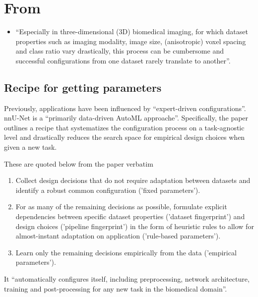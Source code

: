\documentclass[11pt]{article}
\begin{document}


\tableofcontents

\clearpage

\section{From~\cite{nnunet-git-paper}}

\begin{itemize}
    \item ``Especially in three-dimensional (3D) biomedical imaging, for which dataset properties such as imaging modality, image size, (anisotropic) voxel spacing and class ratio vary drastically, this process can be cumbersome and successful configurations from one dataset rarely translate to another''.
\end{itemize}

\subsection{Recipe for getting parameters}

Previously, applications have been influenced by ``expert-driven configurations''. nnU-Net is a ``primarily data-driven AutoML approache''. Specifically, the paper outlines a recipe that systematizes the configuration process on a task-agnostic level and drastically reduces the search space for empirical design choices when given a new task.

These are quoted below from the paper verbatim

\begin{enumerate}
    \item Collect design decisions that do not require adaptation between datasets and identify a robust common configuration ('fixed parameters').
    \item For as many of the remaining decisions as possible, formulate explicit dependencies between specific dataset properties ('dataset fingerprint') and design choices ('pipeline fingerprint') in the form of heuristic rules to allow for almost-instant adaptation on application ('rule-based parameters').
    \item Learn only the remaining decisions empirically from the data ('empirical parameters').
\end{enumerate}

It ``automatically configures itself, including preprocessing, network architecture, training and post-processing for any new task in the biomedical domain''.
\end{document}
